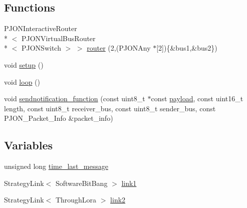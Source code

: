\subsection*{Functions}
\begin{DoxyCompactItemize}
\item 
P\-J\-O\-N\-Interactive\-Router\\*
$<$ P\-J\-O\-N\-Virtual\-Bus\-Router\\*
$<$ P\-J\-O\-N\-Switch $>$ $>$ \hyperlink{BlinkingSwitch__SWBB-TL_8ino_a8c8a35b003b9467f7f3b1a828c90a5b5}{router} (2,(P\-J\-O\-N\-Any $\ast$\mbox{[}2\mbox{]})\{\&bus1,\&bus2\})
\item 
void \hyperlink{BlinkingSwitch__SWBB-TL_8ino_a4fc01d736fe50cf5b977f755b675f11d}{setup} ()
\item 
void \hyperlink{BlinkingSwitch__SWBB-TL_8ino_afe461d27b9c48d5921c00d521181f12f}{loop} ()
\item 
void \hyperlink{BlinkingSwitch__SWBB-TL_8ino_af488e931618139cd40b126dabfe9b6bb}{sendnotification\-\_\-function} (const uint8\-\_\-t $\ast$const \hyperlink{Uno__Dragino__LoRa__GPS__Shield__TTN_8ino_a78a402d1762842473567de90b11ed256}{payload}, const uint16\-\_\-t length, const uint8\-\_\-t receiver\-\_\-bus, const uint8\-\_\-t sender\-\_\-bus, const P\-J\-O\-N\-\_\-\-Packet\-\_\-\-Info \&packet\-\_\-info)
\end{DoxyCompactItemize}
\subsection*{Variables}
\begin{DoxyCompactItemize}
\item 
unsigned long \hyperlink{BlinkingSwitch__SWBB-TL_8ino_a9ba8dfc203186a2f0979d11ff6b9036b}{time\-\_\-last\-\_\-message}
\item 
Strategy\-Link$<$ Software\-Bit\-Bang $>$ \hyperlink{BlinkingSwitch__SWBB-TL_8ino_ae2f4f4a5ca9a8a627a5132d1868bf5c0}{link1}
\item 
Strategy\-Link$<$ Through\-Lora $>$ \hyperlink{BlinkingSwitch__SWBB-TL_8ino_a6ab0c6e3e6ae04f06e58b38531729623}{link2}
\end{DoxyCompactItemize}


